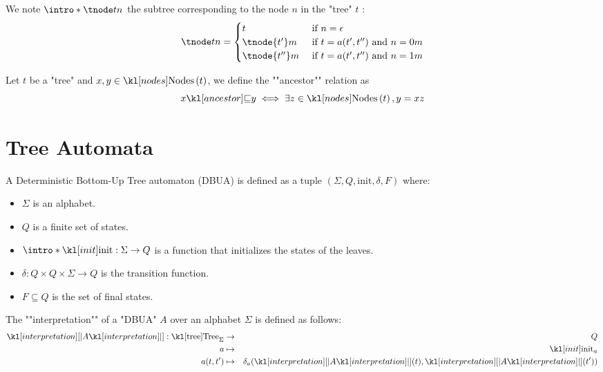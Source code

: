 \documentclass{article}
\begin{document}
\begin{definition}
	We note $\intro* \tnode t n$ the subtree corresponding to the node $n$ in the "tree" $t$ :
	\[
		\tnode t n =   \begin{cases}
			t              & \text{ if }  n = \epsilon                     \\
			\tnode {t'} m  & \text{ if } t = a(t',t'') \text{ and } n = 0m \\
			\tnode {t''} m & \text{ if } t = a(t',t'') \text{ and } n = 1m
		\end{cases}
	\]
\end{definition}

\begin{definition}
	Let $t$ be a "tree" and $x, y \in \nodes t$, we define the ""ancestor"" relation as
	\[ \ancestor x y \iff \exists z \in \nodes t, y = xz \]
\end{definition}

\section{Tree Automata}

\begin{definition}
	A Deterministic Bottom-Up Tree automaton (DBUA) is defined as a tuple $(\Sigma, Q, \text{init}, \delta, F)$ where:
	\begin{itemize}
		\item $\Sigma$ is an alphabet.
		\item $Q$ is a finite set of states.
		\item $\intro *\init : \Sigma \to Q$ is a function that initializes the states of the leaves.
		\item $\delta : Q \times Q \times \Sigma \to Q$ is the transition function.
		\item $F \subseteq Q$ is the set of final states.
	\end{itemize}
\end{definition}

\begin{definition}
	The ""interpretation"" of a "DBUA" $A$ over an alphabet $\Sigma$ is defined as follows:
	\begin{eqnarray*}
		\interpret A : \tree_{\Sigma} &\to& Q \\
		a &\mapsto& \init_a \\
		a(t,t') &\mapsto& \delta_a (\interpret A (t), \interpret A (t'))
	\end{eqnarray*}
\end{definition}
\end{document}
